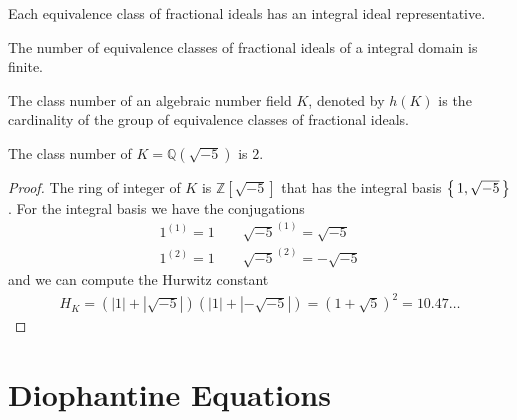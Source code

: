 \begin{thmbox}
    \begin{theorem}
        Each equivalence class of fractional ideals has an integral ideal representative.
    \end{theorem}
\end{thmbox}

\begin{thmbox}
    \begin{theorem}
        The number of equivalence classes of fractional ideals of a integral domain is finite.
    \end{theorem}
\end{thmbox}

\begin{defbox}
    \begin{definition}
        The class number of an algebraic number field \(K\), denoted by \(h(K)\) is the cardinality of the group of equivalence classes of fractional ideals.
    \end{definition}
\end{defbox}

\begin{example}
    The class number of \(K = \mathbb{Q}(\sqrt{-5})\) is \(2\).
\end{example}
\begin{proof}
    The ring of integer of \(K\) is \(\mathbb{Z}[\sqrt{-5}]\) that has the integral basis \(\left\{\, 1, \sqrt{-5} \,\right\}\). For the integral basis we have the conjugations
    \begin{align*}
        1^{(1)} = 1 \qquad \sqrt{-5}^{(1)} = \sqrt{-5}\\
        1^{(2)} = 1 \qquad \sqrt{-5}^{(2)} = -\sqrt{-5}
    \end{align*}
    and we can compute the Hurwitz constant
    \begin{align*}
        H_K = \left(|1| + |\sqrt{-5}|\right) \left(|1| + |-\sqrt{-5}|\right) = (1 + \sqrt{5})^2 = 10.47\ldots
    \end{align*}
\end{proof}

\section*{Diophantine Equations}

